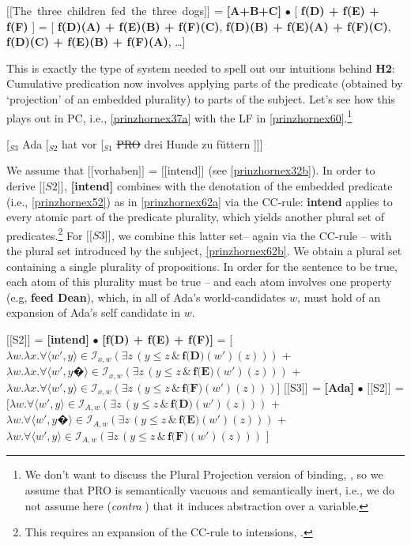 \documentclass[output=paper,colorlinks,citecolor=brown,
]{langscibook}
\newcommand{\sem}[2]{\mbox{$[\![${#2}$]\!]^{#1}$}} %
\begin{document}
\ea \sem{}{The three children fed the three dogs} = \textbf{[A+B+C]} $\bullet$  [ \textbf{f(D) + f(E) + f(F)} ] =  [ \textbf{f(D)(A) + f(E)(B) + f(F)(C)}, \textbf{f(D)(B) + f(E)(A) + f(F)(C)},  \textbf{f(D)(C) + f(E)(B) + f(F)(A)}, \dots ]
\label{prinzhornex53}
\z

This is exactly the type of system needed to spell out our intuitions behind \textbf{H2}: Cumulative predication now involves applying parts of the predicate (obtained by `projection' of an embedded plurality) to parts of the subject. Let's see how this plays out in PC, i.e., \ref{prinzhornex37a} with the LF in \ref{prinzhornex60}.\footnote{We don't want to discuss the  Plural Projection version of binding, \citep{Haslinger:2020d}, so we assume that PRO is semantically vacuous and semantically inert, i.e., we do not assume here (\textit{contra} \citealt{Heim:1998}) that it induces abstraction over a variable.} 

\ea  \label{prinzhornex60} [$_{S3}$ Ada [$_{S2}$ hat vor [$_{S1}$ \sout{PRO} drei Hunde zu f\"{u}ttern ]]]  \z

We assume that \sem{}{vorhaben} = \sem{}{intend} (see \ref{prinzhornex32b}). In order to derive \sem{}{$S2$},  \textbf{[intend]} combines with the denotation of the embedded predicate (i.e., \ref{prinzhornex52}) as in \ref{prinzhornex62a} via the CC-rule: \textbf{intend} applies to every atomic part of the predicate plurality, which yields another plural set of predicates.\footnote{This requires an expansion of the CC-rule to  intensions, \citep{Schmitt:2019a}.} For \sem{}{$S3$}, we combine this latter set-- again via the CC-rule -- with the plural set introduced by the subject, \ref{prinzhornex62b}. We obtain a plural set containing a single plurality of propositions. In order for the sentence to be true, each atom of this plurality must be true -- and each atom involves one property (e.g, {\bf feed Dean}), which, in all of Ada's world-candidates $w$, must hold of an expansion of Ada's self candidate in $w$.




\ea
\ea  \sem{}{S2} = \textbf{[intend]} $\bullet$ \textbf{[f(D) + f(E) + f(F)]} = 
 [$\lambda w. \lambda x. \forall \langle w' ,y \rangle \in \mathcal{I}_{x,w} (\exists  z \,(y \le z\, \& \,\textbf{f(D)}(w')(z)))$ +
 $\lambda w. \lambda x. \forall \langle w' ,y�\rangle \in \mathcal{I}_{x,w} (\exists  z \,(y \le z\, \& \,\textbf{f(E)}(w')(z)))$ +
 $\lambda w. \lambda x. \forall \langle w' ,y \rangle \in \mathcal{I}_{x,w} (\exists  z \,(y \le z\, \& \,\textbf{f(F)}(w')(z)))$]
\label{prinzhornex62a}
\ex \sem{}{S3} = \textbf{[Ada]} $\bullet$ \sem{}{S2} = \\
 $[\lambda w.  \forall \langle w' ,y \rangle \in \mathcal{I}_{A,w} (\exists  z \,(y \le z\, \& \,\textbf{f(D)}(w')(z)))$ +
 $\lambda w.  \forall \langle w' ,y�\rangle \in \mathcal{I}_{A,w} (\exists  z \,(y \le z\, \& \,\textbf{f(E)}(w')(z)))$ +
 $\lambda w.  \forall \langle w' ,y \rangle \in \mathcal{I}_{A,w} (\exists  z \,(y \le z\, \& \,\textbf{f(F)}(w')(z)))$ ]
\label{prinzhornex62b}
\z\z
\end{document}
